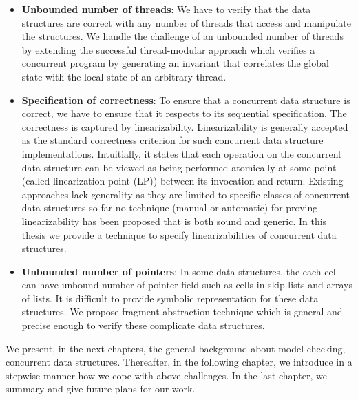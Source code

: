 \begin{itemize}
\item {\bf Unbounded number of threads}: We have to verify that the data structures are correct with any number of threads that access and manipulate the structures. We handle the challenge of an unbounded number of threads by extending the successful
thread-modular approach which verifies a concurrent program by generating
an invariant that correlates the global state with the local state of an arbitrary
thread.
\item {\bf Specification of correctness}: To ensure that a concurrent data structure is correct, we have to ensure that it respects to its sequential specification.  The correctness is captured by linearizability. Linearizability is generally accepted as the standard correctness criterion for such concurrent data structure implementations. Intuitially, it states that each operation on the concurrent data structure can be viewed as being performed atomically at some point (called linearization point (LP)) between its invocation and return. %
    Existing approaches lack generality as they are limited to specific classes of concurrent data structures so far no technique (manual or automatic) for proving linearizability has been proposed that is both sound and generic. In this thesis we provide a technique to specify linearizabilities of concurrent data structures. 
\item {\bf Unbounded number of pointers}: In some data structures, the each cell can have unbound number of pointer field such as cells in skip-lists and arrays of lists. It is difficult to provide symbolic representation for these data structures.  We propose fragment abstraction technique which is general and precise enough to verify these complicate data structures.
\end{itemize}


We present, in the next chapters, the general background about model checking, concurrent data structures. Thereafter, in the following chapter, we introduce in a stepwise manner how
we cope with above challenges. In the last chapter, we summary and give future plans for our work.
